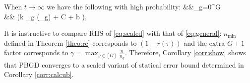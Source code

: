\begin{corollary}
	\label{corr:show}
	When $t \rightarrow \infty$ we have the following with high probability:
	\be
	\label{eq:scaled}
	&&\sum_{g=0}^{G}  
	\leq {} 
	\\  \nr  
	&\times& \left(\zeta k \max_{g \in [G]} \omega(\cA_g) + C  +  b \right),
	\ee
\end{corollary}
	It is instructive to compare RHS of \eqref{eq:scaled} with that of \eqref{eq:general}: $\kappa_{\min}$ defined in Theorem \ref{theo:re} corresponds to $(1 - r(\tau))$ %
	and the extra $G+1$ factor corresponds to $\gamma = \max_{g \in [G] } \frac{n}{n_g}$.
	Therefore, Corollary \ref{corr:show} shows that PBGD converges to a scaled variant of statical error bound determined in Corollary \ref{corr:calcub}.
%
%

